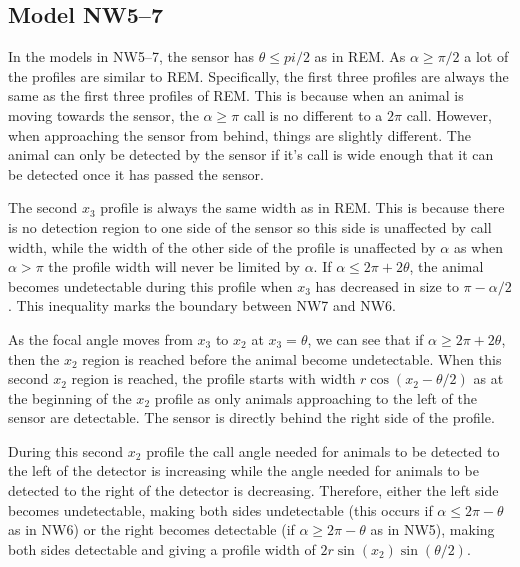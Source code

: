 

\subsection{Model NW5--7} \label{NW57}

In the models in NW5--7, the sensor has $\theta \le pi/2$ as in REM. As $\alpha \ge \pi/2$ a lot of the profiles are similar to REM. Specifically, the first three profiles are always the same as the first three profiles of REM. This is because when an animal is moving towards the sensor, the $\alpha \ge \pi$ call is no different to a $2\pi$ call. However, when approaching the sensor from behind, things are slightly different. The animal can only be detected by the sensor if it's call is wide enough that it can be detected once it has passed the sensor. 

The second $x_3$ profile is always the same width as in REM. This is because there is no detection region to one side of the sensor so this side is unaffected by call width, while the width of the other side of the profile is unaffected by $\alpha$ as when $\alpha>\pi$ the profile width will never be limited by $\alpha$. If $\alpha \le 2\pi + 2\theta$, the animal becomes undetectable during this profile when  $x_3$ has decreased in size to $\pi - \alpha/2$. This inequality marks the boundary between NW7 and NW6. 

As the focal angle moves from $x_3$ to $x_2$  at $x_3=\theta$, we can see that if $\alpha \ge 2\pi + 2\theta$, then the $x_2$ region is reached before the animal become undetectable. When this second $x_2$ region is reached, the profile starts with width $r\cos(x_2 - \theta/2)$ as at the beginning of the $x_2$ profile as only animals approaching to the left of the sensor are detectable. The sensor is directly behind the right side of the profile.

During this second $x_2$ profile the call angle needed for animals to be detected to the left of the detector is increasing while the angle needed for animals to be detected to the right of the detector is decreasing. Therefore, either the left side becomes undetectable, making both sides undetectable (this occurs if $\alpha \le 2\pi - \theta$ as in NW6) or the right becomes detectable (if $\alpha \ge 2\pi - \theta$ as in NW5), making both sides detectable and giving a profile width of $2r\sin(x_2)\sin(\theta/2)$.


